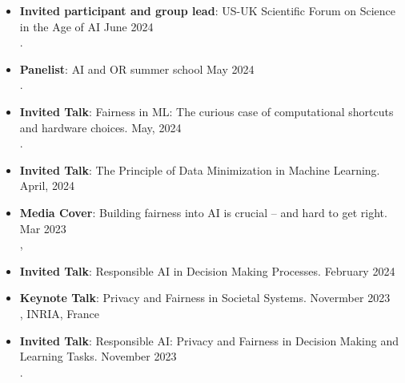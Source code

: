 
\vspace{6pt}
\begin{itemize}
  \item {\bf Invited participant and group lead}: 
  {US-UK Scientific Forum on Science in the Age of AI} \hfill{June 2024}\\
  .

  \item {\bf Panelist}: {AI and OR summer school} \hfill{May 2024}\\
  .

  \item {\bf Invited Talk}: Fairness in ML: The curious case of computational shortcuts and hardware choices. \hfill{May, 2024}\\
  .

  \item {\bf Invited Talk}: The Principle of Data Minimization in Machine Learning. \hfill{April, 2024}\\
  {}

  \item {\bf Media Cover}: 
  {Building fairness into AI is crucial – and hard to get right.} \hfill {Mar 2023} \\
  , 

  \item {\bf Invited Talk}: Responsible AI in Decision Making Processes. \hfill{February 2024}\\
  {}
  
  \item {\bf Keynote Talk}: {Privacy and Fairness in Societal Systems.} \hfill{Novermber 2023}\\
  {, INRIA, France}

  \item {\bf Invited Talk}: {Responsible AI: Privacy and Fairness in Decision Making and Learning Tasks.} \hfill{November 2023}\\
  {.}


\end{itemize}
